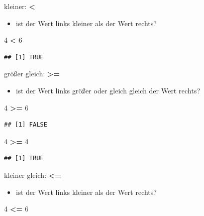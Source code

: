 \documentclass[]{book}
\newenvironment{Shaded}{\begin{snugshade}}{\end{snugshade}}
\newcommand{\DecValTok}[1]{\textcolor[rgb]{0.00,0.00,0.81}{#1}}
\newcommand{\StringTok}[1]{\textcolor[rgb]{0.31,0.60,0.02}{#1}}
\newcommand{\OperatorTok}[1]{\textcolor[rgb]{0.81,0.36,0.00}{\textbf{#1}}}
\providecommand{\tightlist}{%
  \setlength{\itemsep}{0pt}\setlength{\parskip}{0pt}}
\begin{document}
kleiner: \textbf{\textless{}}

\begin{itemize}
\tightlist
\item
  ist der Wert links kleiner als der Wert rechts?
\end{itemize}

\begin{Shaded}
\begin{Highlighting}[]
\DecValTok{4} \OperatorTok{<}\StringTok{ }\DecValTok{6}
\end{Highlighting}
\end{Shaded}

\begin{verbatim}
## [1] TRUE
\end{verbatim}

größer gleich: \textbf{\textgreater{}=}

\begin{itemize}
\tightlist
\item
  ist der Wert links größer oder gleich gleich der Wert rechts?
\end{itemize}

\begin{Shaded}
\begin{Highlighting}[]
\DecValTok{4} \OperatorTok{>=}\StringTok{ }\DecValTok{6}
\end{Highlighting}
\end{Shaded}

\begin{verbatim}
## [1] FALSE
\end{verbatim}

\begin{Shaded}
\begin{Highlighting}[]
\DecValTok{4} \OperatorTok{>=}\StringTok{ }\DecValTok{4}
\end{Highlighting}
\end{Shaded}

\begin{verbatim}
## [1] TRUE
\end{verbatim}

kleiner gleich: \textbf{\textless{}=}

\begin{itemize}
\tightlist
\item
  ist der Wert links kleiner als der Wert rechts?
\end{itemize}

\begin{Shaded}
\begin{Highlighting}[]
\DecValTok{4} \OperatorTok{<=}\StringTok{ }\DecValTok{6}
\end{Highlighting}
\end{Shaded}
\end{document}

